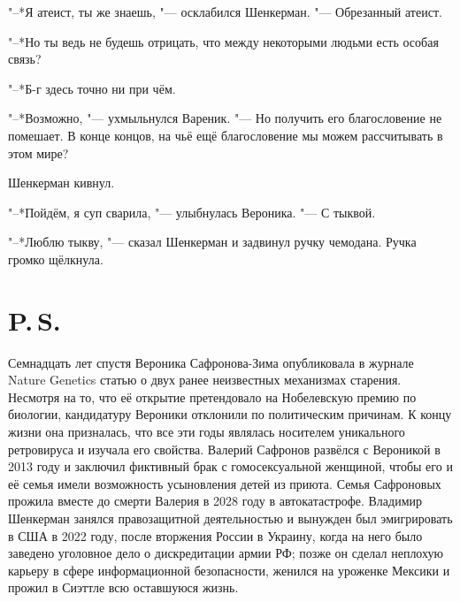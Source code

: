 "--*Я атеист, ты же знаешь, "--- осклабился Шенкерман.
"--- Обрезанный атеист.

"--*Но ты ведь не будешь отрицать, что между некоторыми людьми есть особая связь?

"--*Б-г здесь точно ни при чём.

"--*Возможно, "--- ухмыльнулся Вареник.
"--- Но получить его благословение не помешает.
В конце концов, на чьё ещё благословение мы можем рассчитывать в этом мире?

Шенкерман кивнул.

"--*Пойдём, я суп сварила, "--- улыбнулась Вероника.
"--- С тыквой.

"--*Люблю тыкву, "--- сказал Шенкерман и задвинул ручку чемодана.
Ручка громко щёлкнула.

\chapter*{P.\,S.}

Семнадцать лет спустя Вероника Сафронова-Зима опубликовала в журнале Nature Genetics статью о двух ранее неизвестных механизмах старения.
Несмотря на то, что её открытие претендовало на Нобелевскую премию по биологии, кандидатуру Вероники отклонили по политическим причинам.
К концу жизни она призналась, что все эти годы являлась носителем уникального ретровируса и изучала его свойства.
Валерий Сафронов развёлся с Вероникой в 2013 году и заключил фиктивный брак с гомосексуальной женщиной, чтобы его и её семья имели возможность усыновления детей из приюта.
Семья Сафроновых прожила вместе до смерти Валерия в 2028 году в автокатастрофе.
Владимир Шенкерман занялся правозащитной деятельностью и вынужден был эмигрировать в США в 2022 году, после вторжения России в Украину, когда на него было заведено уголовное дело о дискредитации армии РФ;
позже он сделал неплохую карьеру в сфере информационной безопасности, женился на уроженке Мексики и прожил в Сиэттле всю оставшуюся жизнь.


